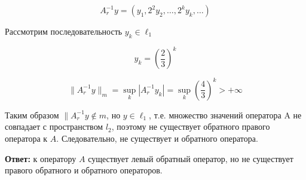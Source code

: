 \documentclass[a4paper, 12pt]{report}
\begin{document}
\[A_r^{ - 1} y = (y_1, 2^2 y_2, \dots , 2^k y_k, \dots )\]

Рассмотрим последовательность $y_k \in \ell_1$

\[y_k = \left( \frac{2}{3} \right)^k\]

\[\| A_r^{ - 1} y \|_m = \sup_k | A_r^{ - 1} y_k | = \sup_k \left( \frac{4}{3} \right)^k > + \infty\]

Таким образом $\| A_r^{-1}y \notin m$, но $y\in \ell_1$, т.е. множество значений
оператора A не совпадает с пространством $l_2$, поэтому не существует обратного правого
оператора к $A$. Следовательно, не существует и обратного оператора.

\textbf{Ответ:} к оператору $A$ существует левый обратный оператор, но не существует
правого обратного и обратного операторов.
\end{document}
